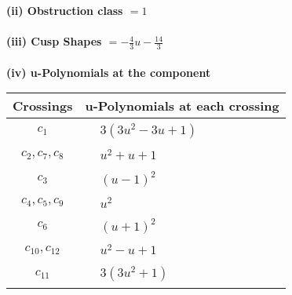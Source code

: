 \documentclass[1p]{elsarticle_modified}
\theoremstyle{definition}
\begin{document}
\flushleft \textbf{(ii) Obstruction class $= 1$}\\~\\
\flushleft \textbf{(iii) Cusp Shapes $= -\frac{4}{3} u-\frac{14}{3}$}\\~\\
\newpage\renewcommand{\arraystretch}{1}
\flushleft \textbf{(iv) u-Polynomials at the component}\newline \\
\begin{tabular}{m{50pt}|m{274pt}}
Crossings & \hspace{64pt}u-Polynomials at each crossing \\
\hline $$\begin{aligned}c_{1}\end{aligned}$$&$\begin{aligned}
&3(3 u^2-3 u+1)
\end{aligned}$\\
\hline $$\begin{aligned}c_{2},c_{7},c_{8}\end{aligned}$$&$\begin{aligned}
&u^2+u+1
\end{aligned}$\\
\hline $$\begin{aligned}c_{3}\end{aligned}$$&$\begin{aligned}
&(u-1)^2
\end{aligned}$\\
\hline $$\begin{aligned}c_{4},c_{5},c_{9}\end{aligned}$$&$\begin{aligned}
&u^2
\end{aligned}$\\
\hline $$\begin{aligned}c_{6}\end{aligned}$$&$\begin{aligned}
&(u+1)^2
\end{aligned}$\\
\hline $$\begin{aligned}c_{10},c_{12}\end{aligned}$$&$\begin{aligned}
&u^2- u+1
\end{aligned}$\\
\hline $$\begin{aligned}c_{11}\end{aligned}$$&$\begin{aligned}
&3(3 u^2+1)
\end{aligned}$\\
\hline
\end{tabular}\\~\\
\end{document}
